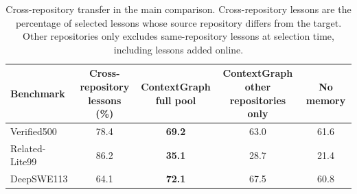 \documentclass{article}
\begin{document}
\begin{table}[!htbp]
\centering
\caption{Cross-repository transfer in the main comparison. Cross-repository
lessons are the percentage of selected lessons whose source repository
differs from the target. Other repositories only excludes same-repository
lessons at selection time, including lessons added online.}
\label{tab:cross-repo}
\small
\begin{tabular}{lcccc}
\toprule
Benchmark & \shortstack{Cross-repository\\lessons (\%)} & \shortstack{ContextGraph\\full pool} & \shortstack{ContextGraph\\other repositories only} & No memory \\
\midrule
Verified500 & 78.4 & \textbf{69.2} & 63.0 & 61.6 \\
Related-Lite99 & 86.2 & \textbf{35.1} & 28.7 & 21.4 \\
DeepSWE113 & 64.1 & \textbf{72.1} & 67.5 & 60.8 \\
\bottomrule
\end{tabular}
\end{table}
\end{document}
